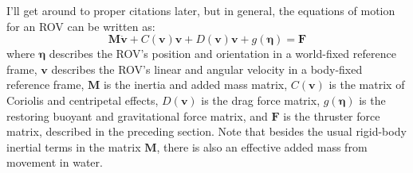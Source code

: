 \documentclass{article}
\renewcommand{\vec}[1]{\mathbf{#1}}
\begin{document}
I'll get around to proper citations later, but in general, the equations of motion for an ROV can be written as:
\begin{equation}
  \vec{M}\dot{\vec{v}} + C(\vec{v})\vec{v} + D(\vec{v})\vec{v} + g(\vec{\eta}) = \vec{F}
\end{equation}
where $\vec{\eta}$ describes the ROV's position and orientation in a world-fixed reference frame, $\vec{v}$ describes the ROV's linear and angular velocity in a body-fixed reference frame, $\vec{M}$ is the inertia and added mass matrix, $C(\vec{v})$ is the matrix of Coriolis and centripetal effects, $D(\vec{v})$ is the drag force matrix, $g(\vec{\eta})$ is the restoring buoyant and gravitational force matrix, and $\vec{F}$ is the thruster force matrix, described in the preceding section. Note that besides the usual rigid-body inertial terms in the matrix $\vec{M}$, there is also an effective added mass from movement in water.
\end{document}
